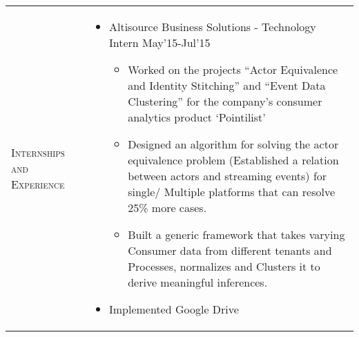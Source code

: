 \documentclass[a4paper]{article}
\begin{document}
\begin{longtable}{@{}m{3.0cm}m{14cm}@{}}
  \textrm{\textsc{Internships and Experience}} &
                                                  \vspace{-7mm}
                                                  \begin{itemize} 
                                                  \item 
                                                    Altisource Business Solutions - Technology Intern \hfill  May'15-Jul'15
                                                    \begin{itemize} \itemsep -2pt
                                                    \item Worked on the projects ``Actor Equivalence and Identity Stitching'' and ``Event Data Clustering''
                                                      for the company's consumer analytics product `Pointilist'
                                                    \item Designed an algorithm for solving the actor equivalence problem (Established a relation between
                                                      actors and streaming
                                                      events) for single/
                                                      Multiple platforms that
                                                      can resolve 25\% more cases.
                                                    \item Built a generic
                                                      framework that takes varying
                                                      Consumer data from
                                                      different tenants and
                                                      Processes, normalizes and
                                                      Clusters it to derive
                                                      meaningful inferences.
                                                    \end{itemize}
                                                  \item
                                                    Implemented Google Drive

\end{itemize}
\end{longtable}
\end{document}

